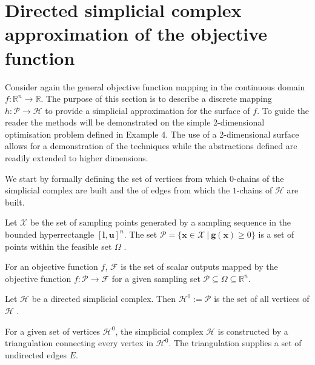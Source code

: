 \section{Directed simplicial complex approximation of the objective function}
Consider again the general objective function mapping in the continuous domain $f : \mathbb{R}^n \rightarrow \mathbb{R}$. The purpose of this section is to describe a discrete mapping $h: \mathcal{P}\rightarrow \mathcal{H}$ to provide a simplicial approximation for the surface of $f$. To guide the reader the methods will be demonstrated on the simple 2-dimensional optimisation problem defined in Example 4. The use of a 2-dimensional surface allows for a demonstration of the techniques while the abstractions defined are readily extended to higher dimensions. 

We start by formally defining the set of vertices from which $0$-chains of the simplicial complex are built and the of edges from which the $1$-chains of $\mathcal{H}$ are built.

\begin{definition} \label{def:h0}
Let  $\mathcal{X}$ be the set of sampling points generated by a sampling sequence in the bounded hyperrectangle $[\mathbf{l}, \mathbf{u}]^n$. The set $\mathcal{P} = \{\mathbf{x} \in \mathcal{X}~|~\mathbf{g}(\mathbf{x}) \geq 0 \}$ is a set of points within the feasible set $\Omega$ .
\end{definition}

\begin{definition} \label{def:h0.5}
For an objective function $f$, $\mathcal{F}$ is the set of scalar outputs mapped by the objective function $f:\mathcal{P} \rightarrow \mathcal{F}$ for a given sampling set $\mathcal{P} \subseteq \Omega \subseteq \mathbb{R}^n$.
\end{definition}

\begin{definition} \label{def:h1}
Let $\mathcal{H}$ be a directed simplicial complex. Then $\mathcal{H}^0 := \mathcal{P}$ is the set of all vertices of $\mathcal{H}$ .
\end{definition}

\begin{definition} \label{def:h2}
For a given set of vertices $\mathcal{H}^0$, the simplicial complex $\mathcal{H}$ is constructed by a triangulation connecting every vertex in $\mathcal{H}^0$. The triangulation supplies a set of undirected edges $E$.
\end{definition}

